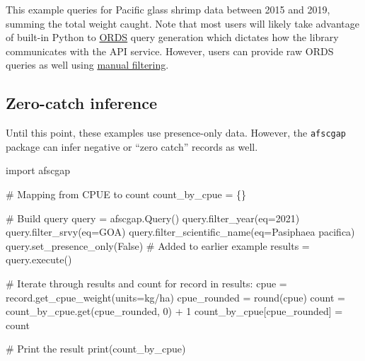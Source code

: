 \documentclass[
  letterpaper,
  oneside,
  open=any]{scrbook}
\newenvironment{Shaded}{\begin{snugshade}}{\end{snugshade}}
\newcommand{\AttributeTok}[1]{\textcolor[rgb]{0.40,0.45,0.13}{#1}}
\newcommand{\CommentTok}[1]{\textcolor[rgb]{0.37,0.37,0.37}{#1}}
\newcommand{\ControlFlowTok}[1]{\textcolor[rgb]{0.00,0.23,0.31}{#1}}
\newcommand{\DecValTok}[1]{\textcolor[rgb]{0.68,0.00,0.00}{#1}}
\newcommand{\FunctionTok}[1]{\textcolor[rgb]{0.28,0.35,0.67}{#1}}
\newcommand{\NormalTok}[1]{\textcolor[rgb]{0.00,0.23,0.31}{#1}}
\newcommand{\OtherTok}[1]{\textcolor[rgb]{0.00,0.23,0.31}{#1}}
\newcommand{\SpecialCharTok}[1]{\textcolor[rgb]{0.37,0.37,0.37}{#1}}
\newcommand{\StringTok}[1]{\textcolor[rgb]{0.13,0.47,0.30}{#1}}
\begin{document}
This example queries for Pacific glass shrimp data between 2015 and
2019, summing the total weight caught. Note that most users will likely
take advantage of built-in Python to
\href{https://www.oracle.com/database/technologies/appdev/rest.html}{ORDS}
query generation which dictates how the library communicates with the
API service. However, users can provide raw ORDS queries as well using
\href{https://pyafscgap.org/devdocs/afscgap.html\#manual-filtering}{manual
filtering}.

\hypertarget{zero-catch-inference}{%
\subsection{Zero-catch inference}\label{zero-catch-inference}}

Until this point, these examples use presence-only data. However, the
\texttt{afscgap} package can infer negative or ``zero catch'' records as
well.

\begin{Shaded}
\begin{Highlighting}[]
\NormalTok{import afscgap}

\CommentTok{\# Mapping from CPUE to count}
\NormalTok{count\_by\_cpue }\OtherTok{=}\NormalTok{ \{\}}

\CommentTok{\# Build query}
\NormalTok{query }\OtherTok{=} \FunctionTok{afscgap.Query}\NormalTok{()}
\FunctionTok{query.filter\_year}\NormalTok{(}\AttributeTok{eq=}\DecValTok{2021}\NormalTok{)}
\FunctionTok{query.filter\_srvy}\NormalTok{(}\AttributeTok{eq=}\StringTok{\textquotesingle{}GOA\textquotesingle{}}\NormalTok{)}
\FunctionTok{query.filter\_scientific\_name}\NormalTok{(}\AttributeTok{eq=}\StringTok{\textquotesingle{}Pasiphaea pacifica\textquotesingle{}}\NormalTok{)}
\FunctionTok{query.set\_presence\_only}\NormalTok{(False)  }\CommentTok{\# Added to earlier example}
\NormalTok{results }\OtherTok{=} \FunctionTok{query.execute}\NormalTok{()}

\CommentTok{\# Iterate through results and count}
\ControlFlowTok{for}\NormalTok{ record }\ControlFlowTok{in}\NormalTok{ results}\SpecialCharTok{:}
\NormalTok{  cpue }\OtherTok{=} \FunctionTok{record.get\_cpue\_weight}\NormalTok{(}\AttributeTok{units=}\StringTok{\textquotesingle{}kg/ha\textquotesingle{}}\NormalTok{)}
\NormalTok{  cpue\_rounded }\OtherTok{=} \FunctionTok{round}\NormalTok{(cpue)}
\NormalTok{  count }\OtherTok{=} \FunctionTok{count\_by\_cpue.get}\NormalTok{(cpue\_rounded, }\DecValTok{0}\NormalTok{) }\SpecialCharTok{+} \DecValTok{1}
\NormalTok{  count\_by\_cpue[cpue\_rounded] }\OtherTok{=}\NormalTok{ count}

\CommentTok{\# Print the result}
\FunctionTok{print}\NormalTok{(count\_by\_cpue)}
\end{Highlighting}
\end{Shaded}
\end{document}
